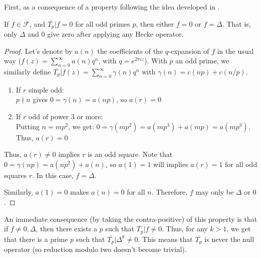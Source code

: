 First, as a consequence of a property following the idea developed in \cite[p.33]{TheWebOfModularityArithmeticOfTheCoefficientsOfModularForms}.
\begin{property}
	If $f \in \mathcal{F}$, and $\overline{T_p}|f = 0$ for all odd primes $p$, then either $f = 0$ or $f = \Delta$.
	That is, only $\Delta$ and $0$ give zero after applying any Hecke operator.
\end{property}
\begin{proof}
	Let's denote by $a(n)$ the coefficients of the $q$-expansion of $f$ in the usual way ($f(z) = \sum_{n=0}^{\infty} a(n)q^n$, with $q=e^{2\pi i z}$).
	With $p$ an odd prime, we similarly define $\overline{T_p}|f(z) = \sum_{n=0}^{\infty} \gamma(n)q^n$ with $\gamma(n) = c(np) + c(n/p)$.
	\begin{enumerate}
		\item If $r$ simple odd:\\
		$p \nmid n$ gives $0 = \gamma(n) = a(np)$,
		so $a(r)=0$
		\item If $r$ odd of power 3 or more:\\
		Putting $n=mp^2$, we get: $0 = \gamma(mp^2) = a(mp^3)+a(mp) = a(mp^3)$.\\
		Thus, $a(r)=0$
	\end{enumerate}
	Thus, $a(r) \neq 0$ implies $r$ is an odd square.
	Note that $0 = \gamma(np) = a(np^2) + a(n)$, so $a(1)=1$ will implies $a(r)=1$ for all odd squares $r$.
	In this case, $f = \Delta$.
	
	Similarly, $a(1)=0$ makes $a(n)=0$ for all $n$.
	Therefore, $f$ may only be $\Delta$ or $0$.
\end{proof}

An immediate consequence (by taking the contra-positive) of this property is that if $f \neq 0, \Delta$, then there exists a $p$ such that $\overline{T_p}|f \neq 0$.
Thus, for any $k > 1$, we get that there is a prime $p$ such that $\overline{T_p}|\Delta^k \neq 0$.
This means that $\overline{T_p}$ is never the null operator (so reduction modulo two doesn't become trivial).



